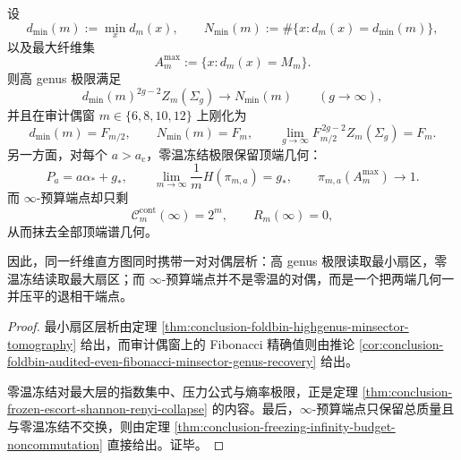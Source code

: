 \begin{theorem}\label{thm:conclusion-highgenus-freezing-infinity-budget-dual-tomography-split}
设
\[
d_{\min}(m):=\min_x d_m(x),
\qquad
N_{\min}(m):=\#\{x:d_m(x)=d_{\min}(m)\},
\]
以及最大纤维集
\[
A_m^{\max}:=\{x:d_m(x)=M_m\}.
\]
则高 genus 极限满足
\[
d_{\min}(m)^{2g-2}Z_m(\Sigma_g)\longrightarrow N_{\min}(m)
\qquad(g\to\infty),
\]
并且在审计偶窗 \(m\in\{6,8,10,12\}\) 上刚化为
\[
d_{\min}(m)=F_{m/2},
\qquad
N_{\min}(m)=F_m,
\qquad
\lim_{g\to\infty}F_{m/2}^{\,2g-2}Z_m(\Sigma_g)=F_m.
\]
另一方面，对每个 \(a>a_{\mathrm c}\)，零温冻结极限保留顶端几何：
\[
P_a=a\alpha_\ast+g_\ast,
\qquad
\lim_{m\to\infty}\frac1m H(\pi_{m,a})=g_\ast,
\qquad
\pi_{m,a}(A_m^{\max})\to 1.
\]
而 \(\infty\)-预算端点却只剩
\[
\mathcal C_m^{\mathrm{cont}}(\infty)=2^m,
\qquad
R_m(\infty)=0,
\]
从而抹去全部顶端谱几何。

因此，同一纤维直方图同时携带一对对偶层析：高 genus 极限读取最小扇区，零温冻结读取最大扇区；而 \(\infty\)-预算端点并不是零温的对偶，而是一个把两端几何一并压平的退相干端点。
\end{theorem}
\begin{proof}
最小扇区层析由定理 \ref{thm:conclusion-foldbin-highgenus-minsector-tomography} 给出，而审计偶窗上的 Fibonacci 精确值则由推论 \ref{cor:conclusion-foldbin-audited-even-fibonacci-minsector-genus-recovery} 给出。

零温冻结对最大层的指数集中、压力公式与熵率极限，正是定理 \ref{thm:conclusion-frozen-escort-shannon-renyi-collapse} 的内容。最后，\(\infty\)-预算端点只保留总质量且与零温冻结不交换，则由定理 \ref{thm:conclusion-freezing-infinity-budget-noncommutation} 直接给出。证毕。
\end{proof}

